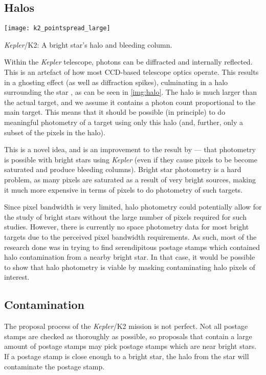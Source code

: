 \documentclass{book}
\begin{document}
\subsection{Halos}

\begin{staticfigure}
	\centering
		\texttt{[image: k2\_pointspread\_large]}
	\caption{\textit{Kepler}/K2: A bright star's halo and bleeding column.}
	\label{img:halo}
\end{staticfigure}

Within the \textit{Kepler} telescope, photons can be diffracted and internally
reflected. This is an artefact of how most CCD-based telescope optics operate.
This results in a ghosting effect (as well as diffraction spikes), culminating
in a halo surrounding the star \citep{2009PASP..121.1267S}, as can be seen in
\autoref{img:halo}. The halo is much larger than the actual target, and we
assume it contains a photon count proportional to the main target. This means
that it should be possible (in principle) to do meaningful photometry of a target
using only this halo (and, further, only a subset of the pixels in the halo).

This is a novel idea, and is an improvement to the result by \citet{2011MNRAS.411..878K}
--- that photometry is possible with bright stars using \textit{Kepler} (even if
they cause pixels to be become saturated and produce bleeding columns). Bright
star photometry is a hard problem, as many pixels are saturated as a result of
very bright sources, making it much more expensive in terms of pixels to do
photometry of such targets.

Since pixel bandwidth is very limited, halo photometry could potentially allow
for the study of bright stars without the large number of pixels required for
such studies. However, there is currently no space photometry data for most bright
targets due to the perceived pixel bandwidth requirements. As such, most of the
research done was in trying to find serendipitous postage stamps which contained
halo contamination from a nearby bright star. In that case, it would be possible
to show that halo photometry is viable by masking contaminating halo pixels of
interest.

\subsection{Contamination}

The proposal process of the \textit{Kepler}/K2 mission is not perfect. Not all
postage stamps are checked as thoroughly as possible, so proposals that contain
a large amount of postage stamps may pick postage stamps which are near bright
stars. If a postage stamp is close enough to a bright star, the halo from the
star will contaminate the postage stamp.
\end{document}

